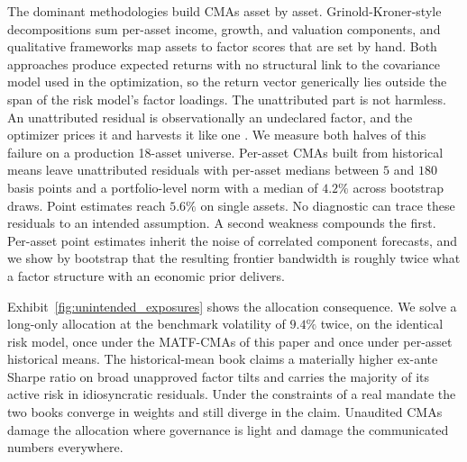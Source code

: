 \documentclass[pdftex,12pt,a4paper]{article}
\begin{document}
The dominant methodologies build CMAs asset by asset. Grinold-Kroner-style decompositions \citep{GrinoldKroner2002} sum per-asset income, growth, and valuation components, and qualitative frameworks map assets to factor scores that are set by hand. Both approaches produce expected returns with no structural link to the covariance model used in the optimization, so the return vector generically lies outside the span of the risk model's factor loadings. The unattributed part is not harmless. An unattributed residual is observationally an undeclared factor, and the optimizer prices it and harvests it like one \citep{CampbellLoMacKinlay1997}. We measure both halves of this failure on a production 18-asset universe. Per-asset CMAs built from historical means leave unattributed residuals with per-asset medians between $5$ and $180$ basis points and a portfolio-level norm with a median of $4.2\%$ across bootstrap draws. Point estimates reach $5.6\%$ on single assets. No diagnostic can trace these residuals to an intended assumption. A second weakness compounds the first. Per-asset point estimates inherit the noise of correlated component forecasts, and we show by bootstrap that the resulting frontier bandwidth is roughly twice what a factor structure with an economic prior delivers.

Exhibit~\ref{fig:unintended_exposures} shows the allocation consequence. We solve a long-only allocation at the benchmark volatility of $9.4\%$ twice, on the identical risk model, once under the MATF-CMAs of this paper and once under per-asset historical means. The historical-mean book claims a materially higher ex-ante Sharpe ratio on broad unapproved factor tilts and carries the majority of its active risk in idiosyncratic residuals. Under the constraints of a real mandate the two books converge in weights and still diverge in the claim. Unaudited CMAs damage the allocation where governance is light and damage the communicated numbers everywhere.
\end{document}
